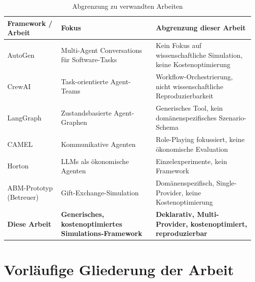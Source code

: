 \documentclass[12pt, a4paper]{article}
\begin{document}
\begin{table}[h!]
    \centering
    \small
    \begin{tabularx}{\textwidth}{lp{3.8cm}X}
        \toprule
        \textbf{Framework / Arbeit} & \textbf{Fokus} & \textbf{Abgrenzung dieser Arbeit} \\
        \midrule
        AutoGen \cite{wu2023}
            & Multi-Agent Conversations für Software-Tasks
            & Kein Fokus auf wissenschaftliche Simulation, keine Kostenoptimierung \\
        CrewAI
            & Task-orientierte Agent-Teams
            & Workflow-Orchestrierung, nicht wissenschaftliche Reproduzierbarkeit \\
        LangGraph
            & Zustandsbasierte Agent-Graphen
            & Generisches Tool, kein domänenspezifisches Szenario-Schema \\
        CAMEL \cite{li2023}
            & Kommunikative Agenten
            & Role-Playing fokussiert, keine ökonomische Evaluation \\
        Horton \cite{horton2023}
            & LLMs als ökonomische Agenten
            & Einzelexperimente, kein Framework \\
        ABM-Prototyp (Betreuer)
            & Gift-Exchange-Simulation
            & Domänenspezifisch, Single-Provider, keine Kostenoptimierung \\
        \midrule
        \textbf{Diese Arbeit}
            & \textbf{Generisches, kosten\-optimiertes Simulations-Framework}
            & \textbf{Deklarativ, Multi-Provider, kostenoptimiert, reproduzierbar} \\
        \bottomrule
    \end{tabularx}
    \caption{Abgrenzung zu verwandten Arbeiten}
    \label{tab:related}
\end{table}

\section{Vorläufige Gliederung der Arbeit}
\end{document}
